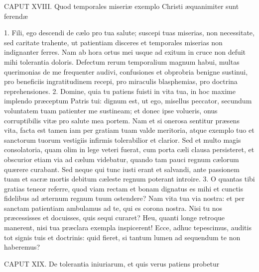 CAPUT XVIII.
Quod temporales miseriæ exemplo Christi æquanimiter sunt ferendæ

1. Fili, ego descendi de cælo pro tua salute; suscepi tuas miserias, non necessitate, sed caritate trahente, ut patientiam disceres et temporales miserias non indignanter ferres. Nam ab hora ortus mei usque ad exitum in cruce non defuit mihi tolerantia doloris. Defectum rerum temporalium magnum habui, multas querimonias de me frequenter audivi, confusiones et obprobria benigne sustinui, pro beneficiis ingratitudinem recepi, pro miraculis blasphemias, pro doctrina reprehensiones.
2. Domine, quia tu patiens fuisti in vita tua, in hoc maxime implendo præceptum Patris tui: dignum est, ut ego, misellus peccator, secundum voluntatem tuam patienter me sustineam; et donec ipse volueris, onus corruptibilis vitæ pro salute mea portem. Nam et si onerosa sentitur præsens vita, facta est tamen iam per gratiam tuam valde meritoria, atque exemplo tuo et sanctorum tuorum vestigiis infirmis tolerabilior et clarior. Sed et multo magis consolatoria, quam olim in lege veteri fuerat, cum porta cæli clausa persisteret, et obscurior etiam via ad cælum videbatur, quando tam pauci regnum cælorum quærere curabant. Sed neque qui tunc iusti erant et salvandi, ante passionem tuam et sacræ mortis debitum cæleste regnum poterant introire.
3. O quantas tibi gratias teneor referre, quod viam rectam et bonam dignatus es mihi et cunctis fidelibus ad æternum regnum tuum ostendere? Nam vita tua via nostra: et per sanctam patientiam ambulamus ad te, qui es corona nostra. Nisi tu nos præcessisses et docuisses, quis sequi curaret? Heu, quanti longe retroque manerent, nisi tua præclara exempla inspicerent! Ecce, adhuc tepescimus, auditis tot signis tuis et doctrinis: quid fieret, si tantum lumen ad sequendum te non haberemus?


CAPUT XIX.
De tolerantia iniuriarum, et quis verus patiens probetur

